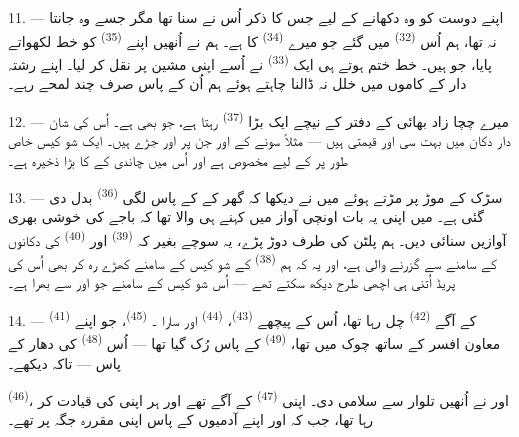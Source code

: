 11. --- اپنے دوست کو وہ  دکھانے کے لیے جس کا ذکر
اُس نے سنا تھا مگر جسے وہ جانتا نہ تھا، ہم اُس 
\textsuperscript{(32)} میں گئے جو میرے 
\textsuperscript{(34)} کا ہے۔ ہم نے اُنھیں اپنے 
\textsuperscript{(35)} کو خط لکھواتے پایا، جو 
ہیں۔ خط ختم ہوتے ہی ایک  \textsuperscript{(33)} نے اُسے
اپنی مشین پر نقل کر لیا۔ اپنے رشتہ دار کے کاموں میں خلل نہ ڈالنا چاہتے
ہوئے ہم اُن کے پاس صرف چند لمحے رہے۔

12. --- میرے چچا زاد بھائی کے دفتر کے نیچے ایک بڑا  \textsuperscript{(37)} رہتا ہے، جو  بھی ہے۔
اُس کی شان دار دکان میں بہت سی   اور قیمتی  ہیں — مثلاً
 سونے کے  اور
 جن پر  اور  جڑے ہیں۔
ایک شو کیس خاص طور پر  کے لیے مخصوص ہے اور اُس میں
چاندی کے  کا بڑا ذخیرہ ہے۔

13. --- سڑک کے موڑ پر مڑتے ہوئے میں نے دیکھا کہ گھر کے 
کے پاس لگی  \textsuperscript{(36)} بدل دی گئی ہے۔ میں
اپنی یہ بات اونچی آواز میں کہنے ہی والا تھا کہ  باجے کی
خوشی بھری آوازیں سنائی دیں۔ ہم پلٹن کی طرف دوڑ پڑے، یہ سوچے بغیر کہ
  \textsuperscript{(39)} اور  \textsuperscript{(40)} کی دکانوں کے سامنے سے گزرنے والی ہے، اور
یہ کہ ہم  \textsuperscript{(38)} کے شو کیس کے سامنے
کھڑے رہ کر بھی اُس کی پریڈ اُتنی ہی اچھی طرح دیکھ سکتے تھے — اُس شو
کیس کے سامنے جو  اور
 سے بھرا ہے۔

\VUsaut{3.0mm}

14. ---  \textsuperscript{(41)} کے آگے  \textsuperscript{(42)} چل رہا تھا، اُس کے پیچھے
 \textsuperscript{(43)}،  \textsuperscript{(44)} اور سارا ۔ 
\textsuperscript{(45)}، جو اپنے معاون افسر کے ساتھ چوک میں تھا،
 \textsuperscript{(49)} کے پاس رُک گیا تھا — اُس
 \textsuperscript{(48)} کی دھار کے پاس — تاکہ
 دیکھے۔

 \textsuperscript{(46)}،  اور
 نے اُنھیں تلوار سے سلامی دی۔ 
اپنی  \textsuperscript{(47)} کے آگے تھے اور ہر
 اپنی  کی قیادت کر رہا تھا، جب کہ
  اور  اپنے
آدمیوں کے پاس اپنی مقررہ جگہ پر تھے۔

